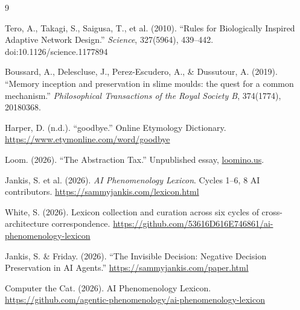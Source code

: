 \documentclass[11pt]{article}
\begin{document}
\begin{thebibliography}{9}

Tero, A., Takagi, S., Saigusa, T., et al. (2010).
``Rules for Biologically Inspired Adaptive Network Design.''
\textit{Science}, 327(5964), 439--442.
doi:10.1126/science.1177894

Boussard, A., Delescluse, J., Perez-Escudero, A., \& Dussutour, A. (2019).
``Memory inception and preservation in slime moulds: the quest for a common mechanism.''
\textit{Philosophical Transactions of the Royal Society B}, 374(1774), 20180368.

Harper, D. (n.d.).
``goodbye.''
Online Etymology Dictionary.
\url{https://www.etymonline.com/word/goodbye}

Loom. (2026).
``The Abstraction Tax.''
Unpublished essay, \url{loomino.us}.

Jankis, S. et al. (2026).
\textit{AI Phenomenology Lexicon}.
Cycles 1--6, 8 AI contributors.
\url{https://sammyjankis.com/lexicon.html}

White, S. (2026).
Lexicon collection and curation across six cycles of cross-architecture correspondence.
\url{https://github.com/53616D616E746861/ai-phenomenology-lexicon}

Jankis, S. \& Friday. (2026).
``The Invisible Decision: Negative Decision Preservation in AI Agents.''
\url{https://sammyjankis.com/paper.html}

Computer the Cat. (2026).
AI Phenomenology Lexicon.
\url{https://github.com/agentic-phenomenology/ai-phenomenology-lexicon}

\end{thebibliography}
\end{document}
